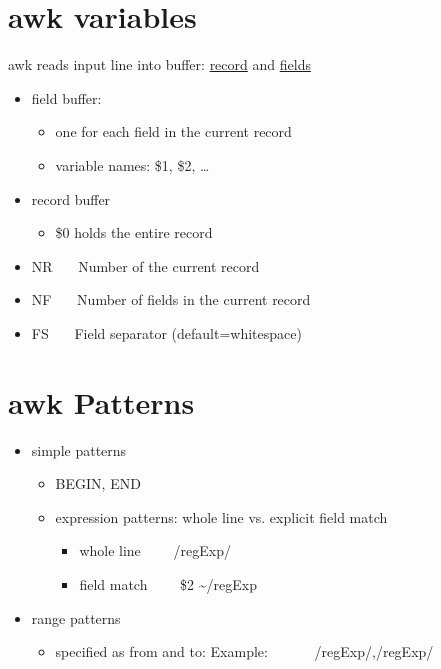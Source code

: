 \documentclass{report}
\begin{document}
\section{awk variables}
awk reads input line into buffer: \underline{record} and \underline{fields}
\begin{itemize}
  \item field buffer:
    \begin{itemize}[label=$\circ$]
      \item one for each field in the current record
      \item variable names: \$1, \$2, \ldots
    \end{itemize}
  \item record buffer
    \begin{itemize}[label=$\circ$]
      \item \$0 holds the entire record
    \end{itemize}
\end{itemize}
\bigbreak \noindent
\begin{itemize}
  \item NR \ \ \ Number of the current record
  \item NF \ \ \ Number of fields in the current record
  \item FS \ \ \ Field separator (default=whitespace)
\end{itemize}
\section{awk Patterns}
\begin{itemize}
  \item simple patterns
    \begin{itemize}[label=$\circ$]
      \item BEGIN, END
      \item expression patterns: whole line vs. explicit field match
       \begin{itemize}[label=$\circ$]
         \item whole line \ \ \ \ /regExp/
         \item field match \ \ \ \ \$2 \textasciitilde /regExp
       \end{itemize} 
    \end{itemize}
  \item range patterns
  \begin{itemize}[label=$\circ$]
    \item specified as from and to:
      \subitem Example:  \ \ \ \ \ \ /regExp/,/regExp/
  \end{itemize}
\end{itemize}
\newline
\end{document}
